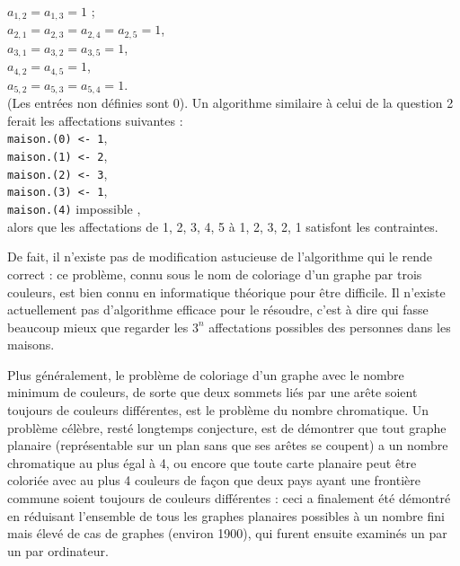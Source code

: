 $a_{1,2}=a_{1,3}=1$ ;\\
$a_{2,1}=a_{2,3}=a_{2,4}=a_{2,5}=1$,\\
$a_{3,1}=a_{3,2}=a_{3,5}=1$,\\
$a_{4,2}=a_{4,5}=1$,\\
$a_{5,2}=a_{5,3}=a_{5,4}=1$.\\
(Les entrées non définies sont 0). Un algorithme similaire à celui de la question 2 ferait les affectations suivantes :\\
\texttt{maison.(0) <- 1},\\
\texttt{maison.(1) <- 2},\\
\texttt{maison.(2) <- 3},\\
\texttt{maison.(3) <- 1},\\
\texttt{maison.(4)} \og impossible \fg{},\\
alors que les affectations de 1, 2, 3, 4, 5 à 1, 2, 3, 2, 1 satisfont les contraintes.
\medskip

De fait, il n'existe pas de modification astucieuse de l'algorithme qui le rende correct : ce problème, connu sous le nom de coloriage d'un graphe par trois couleurs, est bien connu en informatique théorique pour être difficile. Il n'existe actuellement pas d'algorithme efficace pour le résoudre, c'est à dire qui fasse beaucoup mieux que regarder les $3^n$ affectations possibles des personnes dans les maisons.
\medskip

Plus généralement, le problème de coloriage d'un graphe avec le nombre minimum de couleurs, de sorte que deux sommets liés par une arête soient toujours de couleurs différentes, est le problème du nombre chromatique. Un problème célèbre, resté longtemps conjecture, est de démontrer que tout graphe planaire (représentable sur un plan sans que ses arêtes se coupent) a un nombre chromatique au plus égal à 4, ou encore que toute carte planaire peut être coloriée avec au plus 4 couleurs de façon que deux pays ayant une frontière commune soient toujours de couleurs différentes : ceci a finalement été démontré en réduisant l'ensemble de tous les graphes planaires possibles à un nombre fini mais élevé de cas de graphes (environ 1900), qui furent ensuite examinés un par un par ordinateur.
\bigskip

\Fin
